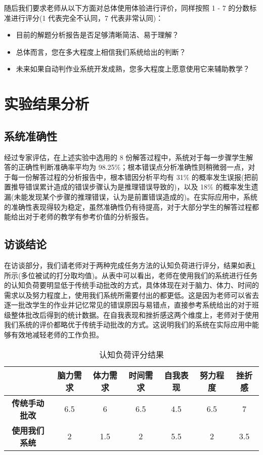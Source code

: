 随后我们要求老师从以下方面对总体使用体验进行评价，同样按照 1 - 7 的分数标准进行评分(1 代表完全不认同，7 代表非常认同)：

\begin{itemize}
    \item 目前的解题分析报告是否足够清晰简洁、易于理解？
    \item 总体而言，您在多大程度上相信我们系统给出的判断？
    \item 未来如果自动判作业系统开发成熟，您多大程度上愿意使用它来辅助教学？
\end{itemize}

\section{实验结果分析}

\subsection{系统准确性}

经过专家评估，在上述实验中选用的 8 份解答过程中，系统对于每一步骤学生解答的正确性判断准确率平均为 98.25\%；根本错误点分析准确性则稍微弱一点，对于每一份解答过程的分析报告中，根本错因分析平均有 31\% 的概率发生误报(把前置推导错误累计造成的错误步骤认为是推理错误导致的)，以及 18\% 的概率发生遗漏(未能发现某个步骤的推理错误，认为是前置错误造成的)。在实际应用中，系统的准确性表现得较为稳定，虽然准确性仍有待提高，对于大部分学生的解答过程都能给出对于老师的教学有参考价值的分析报告。

\subsection{访谈结论}

在访谈部分，我们请老师对于两种完成任务方法的认知负荷进行评分，结果如表\ref{tab:nasa-tlx}所示(多位被试的打分取均值)。从表中可以看出，老师在使用我们的系统进行任务的认知负荷要明显低于传统手动批改的方式，具体体现在对于脑力、体力、时间的需求以及努力程度上，使用我们系统所需要付出的都更低。这是因为老师可以省去逐一批改学生的作业并记忆常见的错误原因与易错点，直接参考系统给出的对于班级整体批改后得到的统计数据。在自我表现和挫折感这两个维度上，老师对于使用我们系统的评价都略优于传统手动批改的方式。这说明我们的系统在实际应用中能够有效地减轻老师的工作负担。

\begin{table}
    \centering
    \caption{认知负荷评分结果}
    \label{tab:nasa-tlx}
    \begin{tabular}{c|cccccc}
        \toprule
        & \textbf{脑力需求} & \textbf{体力需求} & \textbf{时间需求} & \textbf{自我表现} & \textbf{努力程度} & \textbf{挫折感} \\
        \midrule
        \textbf{传统手动批改} & 6.5 & 6 & 6.5 & 4.5 & 6.5 & 7 \\
        \textbf{使用我们系统} & 2 & 1.5 & 2 & 5.5 & 2 & 3.5 \\
        \bottomrule
    \end{tabular}
\end{table}

